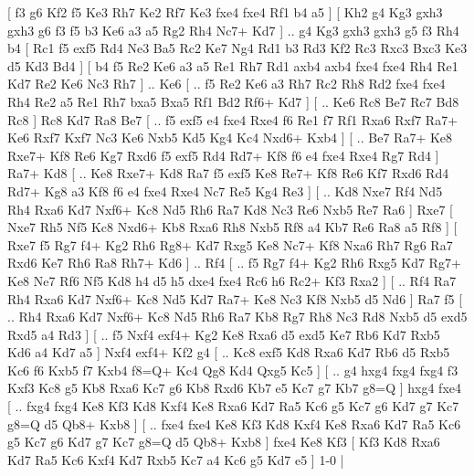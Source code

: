 [  f3 g6  Kf2 f5  Ke3 Rh7  Ke2 Rf7  Ke3 fxe4  fxe4 Rf1  b4 a5   ]  [  Kh2 g4  Kg3 gxh3  gxh3 g6  f3 f5  b3 Ke6  a3 a5  Rg2 Rh4  Nc7+ Kd7   ] .. g4    Kg3   gxh3    gxh3   g5    f3   Rh4    b4 [  Rc1 f5  exf5 Rd4  Ne3 Ba5  Rc2 Ke7  Ng4 Rd1  b3 Rd3  Kf2 Rc3  Rxc3 Bxc3  Ke3 d5  Kd3 Bd4   ]  [  b4 f5  Re2 Ke6  a3 a5  Re1 Rh7  Rd1 axb4  axb4 fxe4  fxe4 Rh4  Re1 Kd7  Re2 Ke6  Nc3 Rh7   ] .. Ke6 [ .. f5  Re2 Ke6  a3 Rh7  Rc2 Rh8  Rd2 fxe4  fxe4 Rh4  Re2 a5  Re1 Rh7  bxa5 Bxa5  Rf1 Bd2  Rf6+ Kd7   ]  [ .. Ke6  Rc8 Be7  Rc7 Bd8  Rc8   ]  Rc8   Kd7    Ra8   Be7 [ .. f5  exf5 e4  fxe4 Rxe4  f6 Re1  f7 Rf1  Rxa6 Rxf7  Ra7+ Ke6  Rxf7 Kxf7  Nc3 Ke6  Nxb5 Kd5  Kg4 Kc4  Nxd6+ Kxb4   ]  [ .. Be7  Ra7+ Ke8  Rxe7+ Kf8  Re6 Kg7  Rxd6 f5  exf5 Rd4  Rd7+ Kf8  f6 e4  fxe4 Rxe4  Rg7 Rd4   ]  Ra7+   Kd8 [ .. Ke8  Rxe7+ Kd8  Ra7 f5  exf5 Ke8  Re7+ Kf8  Re6 Kf7  Rxd6 Rd4  Rd7+ Kg8  a3 Kf8  f6 e4  fxe4 Rxe4  Nc7 Re5  Kg4 Re3   ]  [ .. Kd8  Nxe7 Rf4  Nd5 Rh4  Rxa6 Kd7  Nxf6+ Kc8  Nd5 Rh6  Ra7 Kd8  Nc3 Re6  Nxb5 Re7  Ra6   ]  Rxe7 [  Nxe7 Rh5  Nf5 Kc8  Nxd6+ Kb8  Rxa6 Rh8  Nxb5 Rf8  a4 Kb7  Re6 Ra8  a5 Rf8   ]  [  Rxe7 f5  Rg7 f4+  Kg2 Rh6  Rg8+ Kd7  Rxg5 Ke8  Nc7+ Kf8  Nxa6 Rh7  Rg6 Ra7  Rxd6 Ke7  Rh6 Ra8  Rh7+ Kd6   ] .. Rf4 [ .. f5  Rg7 f4+  Kg2 Rh6  Rxg5 Kd7  Rg7+ Ke8  Ne7 Rf6  Nf5 Kd8  h4 d5  h5 dxe4  fxe4 Rc6  h6 Rc2+  Kf3 Rxa2   ]  [ .. Rf4  Ra7 Rh4  Rxa6 Kd7  Nxf6+ Kc8  Nd5 Kd7  Ra7+ Ke8  Nc3 Kf8  Nxb5 d5  Nd6   ]  Ra7   f5 [ .. Rh4  Rxa6 Kd7  Nxf6+ Kc8  Nd5 Rh6  Ra7 Kb8  Rg7 Rh8  Nc3 Rd8  Nxb5 d5  exd5 Rxd5  a4 Rd3   ]  [ .. f5  Nxf4 exf4+  Kg2 Ke8  Rxa6 d5  exd5 Ke7  Rb6 Kd7  Rxb5 Kd6  a4 Kd7  a5   ]  Nxf4   exf4+    Kf2   g4 [ .. Kc8  exf5 Kd8  Rxa6 Kd7  Rb6 d5  Rxb5 Kc6  f6 Kxb5  f7 Kxb4  f8=Q+ Kc4  Qg8 Kd4  Qxg5 Kc5   ]  [ .. g4  hxg4 fxg4  fxg4 f3  Kxf3 Kc8  g5 Kb8  Rxa6 Kc7  g6 Kb8  Rxd6 Kb7  e5 Kc7  g7 Kb7  g8=Q   ]  hxg4   fxe4 [ .. fxg4  fxg4 Ke8  Kf3 Kd8  Kxf4 Ke8  Rxa6 Kd7  Ra5 Kc6  g5 Kc7  g6 Kd7  g7 Kc7  g8=Q d5  Qb8+ Kxb8   ]  [ .. fxe4  fxe4 Ke8  Kf3 Kd8  Kxf4 Ke8  Rxa6 Kd7  Ra5 Kc6  g5 Kc7  g6 Kd7  g7 Kc7  g8=Q d5  Qb8+ Kxb8   ]  fxe4   Ke8    Kf3    [  Kf3 Kd8  Rxa6 Kd7  Ra5 Kc6  Kxf4 Kd7  Rxb5 Kc7  a4 Kc6  g5 Kd7  e5   ] 1-0  |
